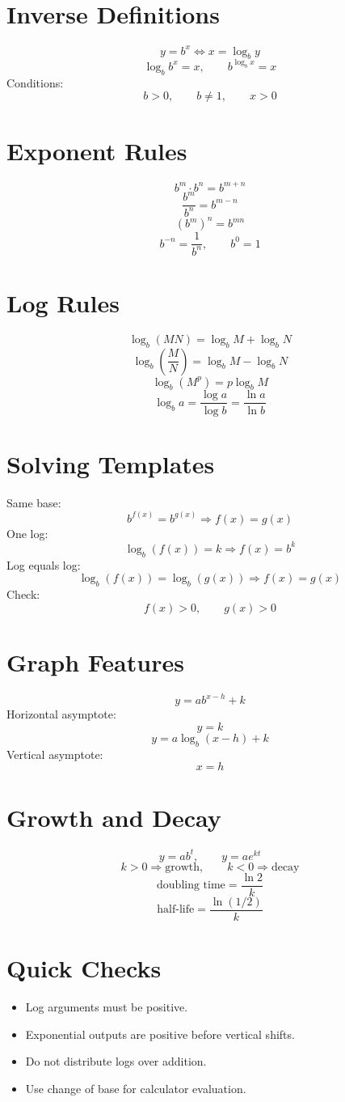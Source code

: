 \documentclass[11pt]{article}
\begin{document}

\section*{Inverse Definitions}
\[
y=b^x\iff x=\log_b y
\]
\[
\log_b b^x=x,\qquad b^{\log_b x}=x
\]
Conditions:
\[
b>0,\qquad b\ne1,\qquad x>0
\]

\section*{Exponent Rules}
\[
b^m\cdot b^n=b^{m+n}
\]
\[
\frac{b^m}{b^n}=b^{m-n}
\]
\[
(b^m)^n=b^{mn}
\]
\[
b^{-n}=\frac1{b^n},\qquad b^0=1
\]

\section*{Log Rules}
\[
\log_b(MN)=\log_bM+\log_bN
\]
\[
\log_b\left(\frac MN\right)=\log_bM-\log_bN
\]
\[
\log_b(M^p)=p\log_bM
\]
\[
\log_b a=\frac{\log a}{\log b}=\frac{\ln a}{\ln b}
\]

\section*{Solving Templates}
Same base:
\[
b^{f(x)}=b^{g(x)}\Rightarrow f(x)=g(x)
\]
One log:
\[
\log_b(f(x))=k\Rightarrow f(x)=b^k
\]
Log equals log:
\[
\log_b(f(x))=\log_b(g(x))\Rightarrow f(x)=g(x)
\]
Check:
\[
f(x)>0,\qquad g(x)>0
\]

\section*{Graph Features}
\[
y=ab^{x-h}+k
\]
Horizontal asymptote:
\[
y=k
\]
\[
y=a\log_b(x-h)+k
\]
Vertical asymptote:
\[
x=h
\]

\section*{Growth and Decay}
\[
y=ab^t,\qquad y=ae^{kt}
\]
\[
k>0\Rightarrow \text{growth},\qquad k<0\Rightarrow \text{decay}
\]
\[
\text{doubling time}=\frac{\ln2}{k}
\]
\[
\text{half-life}=\frac{\ln(1/2)}{k}
\]

\section*{Quick Checks}
\begin{itemize}
  \item Log arguments must be positive.
  \item Exponential outputs are positive before vertical shifts.
  \item Do not distribute logs over addition.
  \item Use change of base for calculator evaluation.
\end{itemize}
\end{document}
